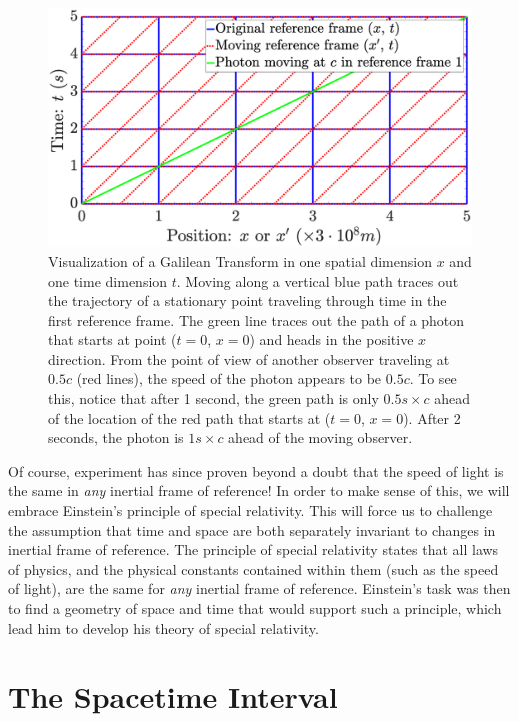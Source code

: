 \documentclass[titlepage,letterpaper,onecolumn,11pt,final]{report}
\numberwithin{equation}{section}
\numberwithin{figure}{section}
\begin{document}
\begin{figure}[!htb]
	\includegraphics[trim={3.3cm 0.1cm 4.5cm 1cm},clip,width=\textwidth]{galilean.eps}
	\caption{\label{fig:galilean} Visualization of a Galilean Transform in one spatial dimension $x$ and one time dimension $t$. Moving along a vertical blue path traces out the trajectory of a stationary point traveling through time in the first reference frame. The green line traces out the path of a photon that starts at point ($t=0$, $x=0$) and heads in the positive $x$ direction. From the point of view of another observer traveling at $0.5c$ (red lines), the speed of the photon appears to be $0.5c$. To see this, notice that after 1 second, the green path is only $0.5 s \times c$ ahead of the location of the red path that starts at ($t=0$, $x=0$). After 2 seconds, the photon is $1 s \times c$ ahead of the moving observer.}
\end{figure}

Of course, experiment has since proven beyond a doubt that the speed of light is the same in \emph{any} inertial frame of reference! In order to make sense of this, we will embrace Einstein's principle of special relativity. This will force us to challenge the assumption that time and space are both separately invariant to changes in inertial frame of reference. The principle of special relativity states that all laws of physics, and the physical constants contained within them (such as the speed of light), are the same for \emph{any} inertial frame of reference. Einstein's task was then to find a geometry of space and time that would support such a principle, which lead him to develop his theory of special relativity.

\section{The Spacetime Interval}
\end{document}
